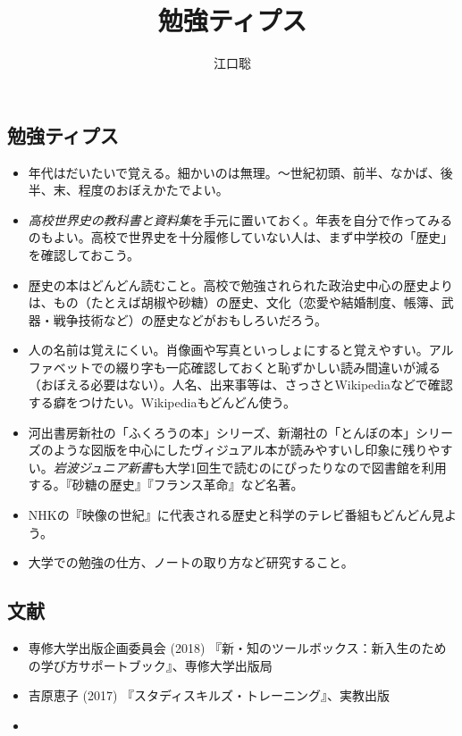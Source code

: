 \documentclass[autodetect-engine,dvipdfmx-if-dvi,ja=standard]{bxjsarticle} \usepackage{mystyle}
\author{江口聡}
\title{勉強ティプス}
\begin{document}
\maketitle
\else\chapter{}
\fi




\section*{勉強ティプス}

\begin{itemize}

\item 年代はだいたいで覚える。細かいのは無理。〜世紀初頭、前半、なかば、後半、末、程度のおぼえかたでよい。

\item \emph{高校世界史の教科書と資料集}を手元に置いておく。年表を自分で作ってみるのもよい。高校で世界史を十分履修していない人は、まず中学校の「歴史」を確認しておこう。
\item 歴史の本はどんどん読むこと。高校で勉強されられた政治史中心の歴史よりは、もの（たとえば胡椒や砂糖）の歴史、文化（恋愛や結婚制度、帳簿、武器・戦争技術など）の歴史などがおもしろいだろう。
\item 人の名前は覚えにくい。肖像画や写真といっしょにすると覚えやすい。アルファベットでの綴り字も一応確認しておくと恥ずかしい読み間違いが減る（おぼえる必要はない）。人名、出来事等は、さっさとWikipediaなどで確認する癖をつけたい。Wikipediaもどんどん使う。
\item 河出書房新社の「ふくろうの本」シリーズ、新潮社の「とんぼの本」シリーズのような図版を中心にしたヴィジュアル本が読みやすいし印象に残りやすい。\emph{岩波ジュニア新書}も大学1回生で読むのにぴったりなので図書館を利用する。『砂糖の歴史』『フランス革命』など名著。

\item NHKの『映像の世紀』に代表される歴史と科学のテレビ番組もどんどん見よう。

\item 大学での勉強の仕方、ノートの取り方など研究すること。

\end{itemize}


\section*{文献}

\begin{itemize}
\item 専修大学出版企画委員会 (2018) 『新・知のツールボックス：新入生のための学び方サポートブック』、専修大学出版局
\item 吉原恵子 (2017) 『スタディスキルズ・トレーニング』、実教出版
\item 
\end{itemize}




\nocite{筒井美紀14:大学選び}


\ifx\mybook\undefined
{}


\end{document}
